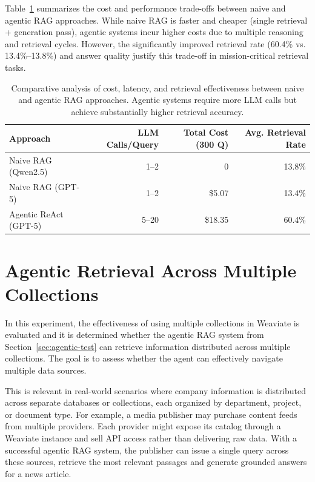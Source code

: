 Table~\ref{tab:naive-vs-agentic-tradeoffs} summarizes the cost and performance trade-offs between naive and agentic \gls{RAG} approaches. While naive \gls{RAG} is faster and cheaper (single retrieval + generation pass), agentic systems incur higher costs due to multiple reasoning and retrieval cycles. However, the significantly improved retrieval rate (60.4\% vs. 13.4\%–13.8\%) and answer quality justify this trade-off in mission-critical retrieval tasks.

\begin{table}[htbp]
    \centering
    \begin{tabular}{l r r r}
        \hline
        Approach & \gls{LLM} Calls/Query & Total Cost (300 Q) & Avg. Retrieval Rate \\
        \hline
        Naive \gls{RAG} (Qwen2.5) & 1--2 & 0 & 13.8\% \\
        Naive \gls{RAG} (\gls{GPT}-5) & 1--2 & \$5.07 & 13.4\% \\
        Agentic ReAct (\gls{GPT}-5) & 5--20 & \$18.35 & 60.4\% \\
        \hline
    \end{tabular}
    \caption{Comparative analysis of cost, latency, and retrieval effectiveness between naive and agentic \gls{RAG} approaches. Agentic systems require more \gls{LLM} calls but achieve substantially higher retrieval accuracy.}
    \label{tab:naive-vs-agentic-tradeoffs}
\end{table}

\section{Agentic Retrieval Across Multiple Collections}
\label{sec:agentic-retrieval-multiple}
In this experiment, the effectiveness of using multiple collections in Weaviate is evaluated and it is determined whether the agentic RAG system from Section~\ref{sec:agentic-test} can retrieve information distributed across multiple collections. The goal is to assess whether the agent can effectively navigate multiple data sources.

This is relevant in real-world scenarios where company information is distributed across separate databases or collections, each organized by department, project, or document type. For example, a media publisher may purchase content feeds from multiple providers. Each provider might expose its catalog through a Weaviate instance and sell API access rather than delivering raw data. With a successful agentic RAG system, the publisher can issue a single query across these sources, retrieve the most relevant passages and generate grounded answers for a news article.

